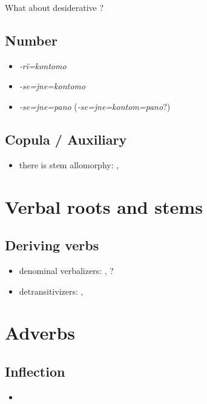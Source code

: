 \documentclass{memoir}
\begin{document}
What about desiderative ?

\section{Number}

\begin{itemize}
\tightlist
\item
  \emph{‑rï=kontomo}
\item
  \emph{‑se=jne=kontomo}
\item
  \emph{‑se=jne=pano} (\emph{‑se=jne=kontom=pano}?)
\end{itemize}

\section{Copula / Auxiliary}

\begin{itemize}
\tightlist
\item
  there is stem allomorphy: , 
\end{itemize}

\chapter{\texorpdfstring{Verbal roots and stems
\label{derbderiv}}{Verbal roots and stems }}

\section{Deriving verbs}

\begin{itemize}
\tightlist
\item
  denominal verbalizers: , ?
\item
  detransitivizers: , 
\end{itemize}

\chapter{\texorpdfstring{Adverbs \label{adverbs}}{Adverbs }}

\section{Inflection}

\begin{itemize}
\tightlist
\item
\end{itemize}
\end{document}
